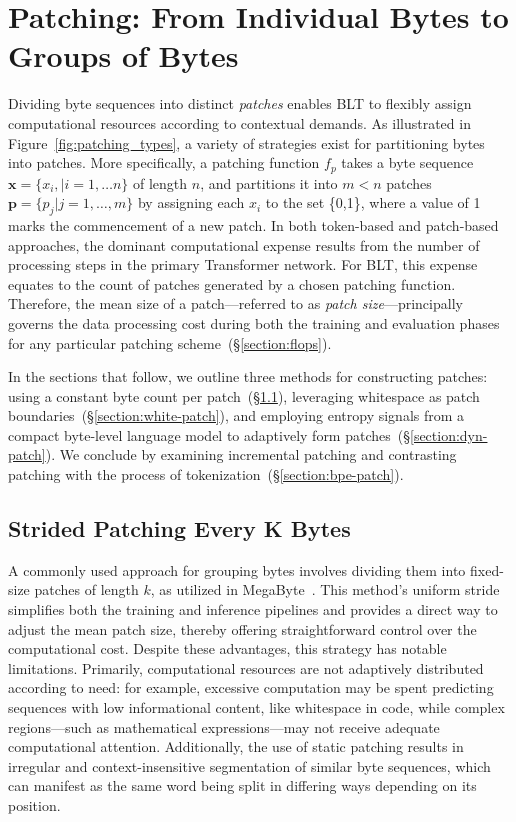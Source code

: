 \section{Patching: From Individual Bytes to Groups of Bytes}
\label{section:patching}

Dividing byte sequences into distinct \textit{patches} enables {\textsc BLT} to flexibly assign computational resources according to contextual demands. As illustrated in Figure~\ref{fig:patching_types}, a variety of strategies exist for partitioning bytes into patches. More specifically, a patching function $f_p$ takes a byte sequence $\pmb{x}=\{x_i,|i=1,\ldots n\}$ of length $n$, and partitions it into $m < n$ patches $\pmb{p}=\{p_j|j=1,\ldots,m\}$ by assigning each $x_i$ to the set \{0,1\}, where a value of 1 marks the commencement of a new patch. In both token-based and patch-based approaches, the dominant computational expense results from the number of processing steps in the primary Transformer network. For {\textsc BLT}, this expense equates to the count of patches generated by a chosen patching function. Therefore, the mean size of a patch—referred to as \textit{patch size}—principally governs the data processing cost during both the training and evaluation phases for any particular patching scheme~(\S\ref{section:flops}).

In the sections that follow, we outline three methods for constructing patches: using a constant byte count per patch~(\S\ref{section:static-patch}), leveraging whitespace as patch boundaries~(\S\ref{section:white-patch}), and employing entropy signals from a compact byte-level language model to adaptively form patches~(\S\ref{section:dyn-patch}). We conclude by examining incremental patching and contrasting patching with the process of tokenization~(\S\ref{section:bpe-patch}).

\subsection{Strided Patching Every K Bytes}
\label{section:static-patch}

A commonly used approach for grouping bytes involves dividing them into fixed-size patches of length $k$, as utilized in MegaByte~\citep{yu2023megabyte}. This method's uniform stride simplifies both the training and inference pipelines and provides a direct way to adjust the mean patch size, thereby offering straightforward control over the computational cost. Despite these advantages, this strategy has notable limitations. Primarily, computational resources are not adaptively distributed according to need: for example, excessive computation may be spent predicting sequences with low informational content, like whitespace in code, while complex regions—such as mathematical expressions—may not receive adequate computational attention. Additionally, the use of static patching results in irregular and context-insensitive segmentation of similar byte sequences, which can manifest as the same word being split in differing ways depending on its position.

